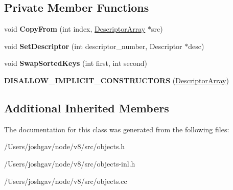 \subsection*{Private Member Functions}
\begin{DoxyCompactItemize}
\item 
void {\bfseries Copy\+From} (int index, \hyperlink{classv8_1_1internal_1_1_descriptor_array}{Descriptor\+Array} $\ast$src)\hypertarget{classv8_1_1internal_1_1_descriptor_array_ac5a59b4fe020a60205cdcfa3d833fe24}{}\label{classv8_1_1internal_1_1_descriptor_array_ac5a59b4fe020a60205cdcfa3d833fe24}

\item 
void {\bfseries Set\+Descriptor} (int descriptor\+\_\+number, Descriptor $\ast$desc)\hypertarget{classv8_1_1internal_1_1_descriptor_array_a39bbfe347dfbe4897a5ba1bfcfafe58f}{}\label{classv8_1_1internal_1_1_descriptor_array_a39bbfe347dfbe4897a5ba1bfcfafe58f}

\item 
void {\bfseries Swap\+Sorted\+Keys} (int first, int second)\hypertarget{classv8_1_1internal_1_1_descriptor_array_a879b95e02f21f2e91e0aefe6d4ce138a}{}\label{classv8_1_1internal_1_1_descriptor_array_a879b95e02f21f2e91e0aefe6d4ce138a}

\item 
{\bfseries D\+I\+S\+A\+L\+L\+O\+W\+\_\+\+I\+M\+P\+L\+I\+C\+I\+T\+\_\+\+C\+O\+N\+S\+T\+R\+U\+C\+T\+O\+RS} (\hyperlink{classv8_1_1internal_1_1_descriptor_array}{Descriptor\+Array})\hypertarget{classv8_1_1internal_1_1_descriptor_array_a69fd89e19168dd191001819e2d4aa86c}{}\label{classv8_1_1internal_1_1_descriptor_array_a69fd89e19168dd191001819e2d4aa86c}

\end{DoxyCompactItemize}
\subsection*{Additional Inherited Members}


The documentation for this class was generated from the following files\+:\begin{DoxyCompactItemize}
\item 
/\+Users/joshgav/node/v8/src/objects.\+h\item 
/\+Users/joshgav/node/v8/src/objects-\/inl.\+h\item 
/\+Users/joshgav/node/v8/src/objects.\+cc\end{DoxyCompactItemize}
